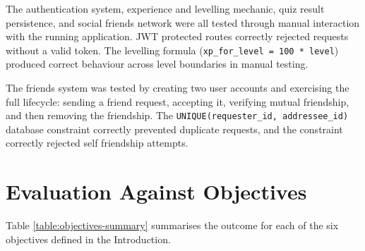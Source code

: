 The authentication system, experience and levelling mechanic, quiz
result persistence, and social friends network were all tested through
manual interaction with the running application. JWT protected routes
correctly rejected requests without a valid token. The levelling
formula (\texttt{xp\_for\_level = 100 * level}) produced correct
behaviour across level boundaries in manual testing.

The friends system was tested by creating two user accounts and
exercising the full lifecycle: sending a friend request, accepting it,
verifying mutual friendship, and then removing the friendship. The
\texttt{UNIQUE(requester\_id, addressee\_id)} database constraint
correctly prevented duplicate requests, and the  constraint correctly rejected self
friendship attempts.

\section{Evaluation Against Objectives}
\label{sec:eval-objectives}

Table \ref{table:objectives-summary} summarises the outcome for each
of the six objectives defined in the Introduction.

